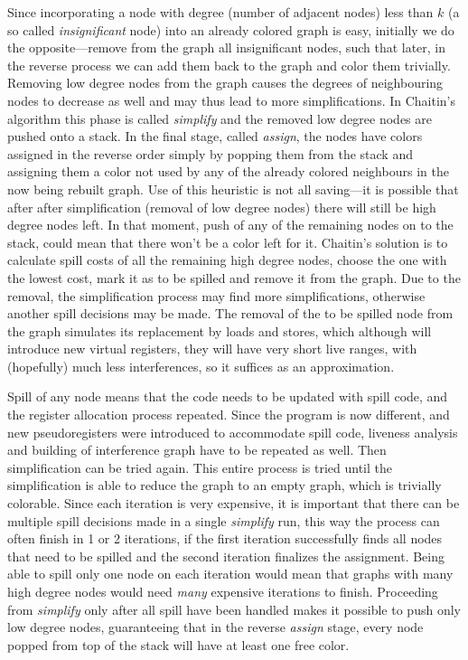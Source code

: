 Since incorporating a node with degree (number of adjacent nodes) less than $k$
(a so called {\em insignificant}
node) into an already colored graph is easy, initially we do the
opposite---remove from the graph all insignificant nodes, such that later, in
the reverse process we can add them back to the graph and color them trivially.
Removing low degree nodes from the graph causes the degrees of neighbouring
nodes to decrease as well and may thus lead to more simplifications. In
Chaitin's algorithm this phase is called {\em simplify} and the
removed low degree nodes are pushed onto a stack. In the final stage, called {\em
assign}, the nodes have colors assigned in the reverse order simply by popping
them from the stack and assigning them a color not used by any of the already
colored neighbours in the now being rebuilt graph. Use of this heuristic is not
all saving---it is possible that after after simplification (removal of low
degree nodes) there will still be high degree nodes left. In that moment, push
of any of the remaining nodes on to the stack, could mean that there won't be a
color left for it. Chaitin's solution is to calculate spill costs of all the
remaining high degree nodes, choose the one with the lowest cost, mark it as
to be spilled and remove it from the graph. Due to the removal, the
simplification process may find more simplifications, otherwise another spill
decisions may be made. The removal of the to be spilled node from the graph
simulates its replacement by loads and stores, which although will introduce new
virtual registers, they will have very short live ranges, with (hopefully) much
less interferences, so it suffices as an approximation.

Spill of any node means that the code needs to be updated with spill code, and
the register allocation process repeated. Since the program is now different,
and new pseudoregisters were introduced to accommodate spill code,
liveness analysis and building of interference graph have to be repeated as
well. Then simplification can be tried again. This entire process is tried
until the simplification is able to reduce the graph to an empty graph, which is
trivially colorable. Since each iteration is very expensive, it is important
that there can be multiple spill decisions made in a single {\em simplify} run,
this way the process can often finish in 1 or 2 iterations, if the first
iteration successfully finds all nodes that need to be spilled and the second
iteration finalizes the assignment.
Being able to spill only one node on each iteration would mean that graphs with
many high degree nodes would need {\em many} expensive iterations to finish.
Proceeding from {\em simplify} only after all spill have been handled makes it
possible to push only low degree nodes, guaranteeing that in the reverse {\em
assign} stage, every node popped from top of the stack will have at least one
free color.

